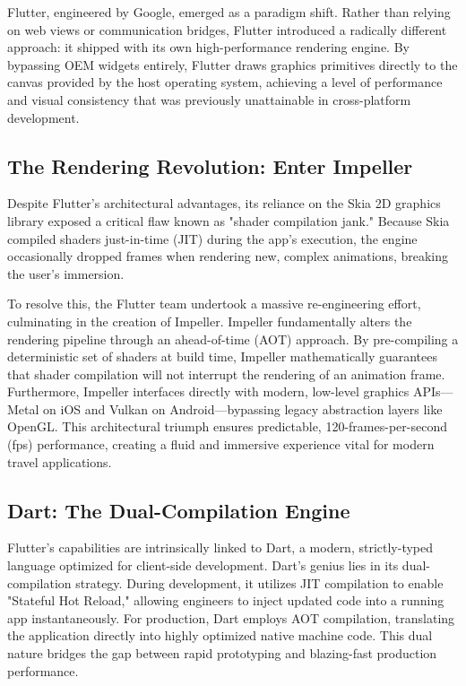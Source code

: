 Flutter, engineered by Google, emerged as a paradigm shift. Rather than relying on web views or communication bridges, Flutter introduced a radically different approach: it shipped with its own high-performance rendering engine. By bypassing OEM widgets entirely, Flutter draws graphics primitives directly to the canvas provided by the host operating system, achieving a level of performance and visual consistency that was previously unattainable in cross-platform development.

\subsection{The Rendering Revolution: Enter Impeller}
Despite Flutter's architectural advantages, its reliance on the Skia 2D graphics library exposed a critical flaw known as "shader compilation jank." Because Skia compiled shaders just-in-time (JIT) during the app's execution, the engine occasionally dropped frames when rendering new, complex animations, breaking the user's immersion.

To resolve this, the Flutter team undertook a massive re-engineering effort, culminating in the creation of Impeller. Impeller fundamentally alters the rendering pipeline through an ahead-of-time (AOT) approach. By pre-compiling a deterministic set of shaders at build time, Impeller mathematically guarantees that shader compilation will not interrupt the rendering of an animation frame. Furthermore, Impeller interfaces directly with modern, low-level graphics APIs—Metal on iOS and Vulkan on Android—bypassing legacy abstraction layers like OpenGL. This architectural triumph ensures predictable, 120-frames-per-second (fps) performance, creating a fluid and immersive experience vital for modern travel applications.

\subsection{Dart: The Dual-Compilation Engine}
Flutter's capabilities are intrinsically linked to Dart, a modern, strictly-typed language optimized for client-side development. Dart's genius lies in its dual-compilation strategy. During development, it utilizes JIT compilation to enable "Stateful Hot Reload," allowing engineers to inject updated code into a running app instantaneously. For production, Dart employs AOT compilation, translating the application directly into highly optimized native machine code. This dual nature bridges the gap between rapid prototyping and blazing-fast production performance.

